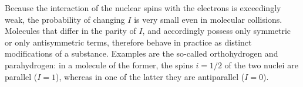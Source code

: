 Because the interaction of the nuclear spins with the electrons is exceedingly weak, the probability of changing $I$ is very small even in molecular collisions. Molecules that differ in the parity of $I$, and accordingly possess only symmetric or only antisymmetric terms, therefore behave in practice as distinct modifications of a substance. Examples are the so-called orthohydrogen and parahydrogen: in a molecule of the former, the spins $i=1/2$ of the two nuclei are parallel ($I=1$), whereas in one of the latter they are antiparallel ($I=0$).
